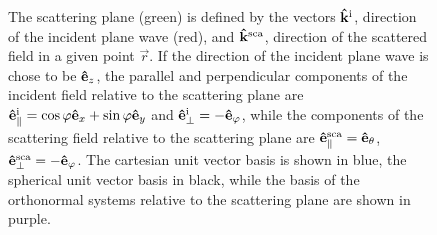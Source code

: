 \begin{figure}[h!]
%
\caption[Scattering plane unit vector systems]{The scattering plane (green) is defined by the vectors $\vu{k}^\text{i}$, direction of the incident plane wave (red), and $\vu{k}^\text{sca}$, direction of the scattered field in a given point $\vec{r}$. If the direction of the incident plane wave is chose to be $\vu{e}_z$, the parallel and perpendicular components of the incident field relative to the scattering plane are $\vu{e}_\parallel^\text{i} = \cos\varphi\vu{e}_x +\sin\varphi\vu{e}_y$ and  $\vu{e}_\perp^\text{i} = -\vu{e}_\varphi$, while the components of the scattering field relative to the scattering plane are $\vu{e}_\parallel^\text{sca} = \vu{e}_\theta$, $\vu{e}_\perp^\text{sca} = - \vu{e}_\varphi$. The cartesian unit vector basis is shown in blue, the spherical unit vector basis in black, while the basis of the orthonormal systems relative to the scattering plane are shown in purple. }
\label{fig:ScatPlane}
	\end{figure}	

